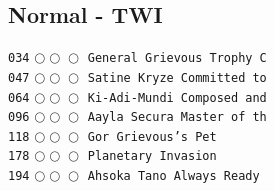 \documentclass[a4paper,landscape]{article}
\begin{document}
\begin{multicols*}{5}
\section{Normal - TWI} 
\vspace{-2mm} 
\texttt{034} \(\bigcirc\!\bigcirc\!\bigcirc\)  \texttt{General Grievous Trophy C} \vspace{-0.3mm}\\ 
\texttt{047} \(\bigcirc\!\bigcirc\!\bigcirc\)  \texttt{Satine Kryze Committed to} \vspace{-0.3mm}\\ 
\texttt{064} \(\bigcirc\!\bigcirc\!\bigcirc\)  \texttt{Ki-Adi-Mundi Composed and} \vspace{-0.3mm}\\ 
\texttt{096} \(\bigcirc\!\bigcirc\!\bigcirc\)  \texttt{Aayla Secura Master of th} \vspace{-0.3mm}\\ 
\texttt{118} \(\bigcirc\!\bigcirc\!\bigcirc\)  \texttt{Gor Grievous's Pet} \vspace{-0.3mm}\\ 
\texttt{178} \(\bigcirc\!\bigcirc\!\bigcirc\)  \texttt{Planetary Invasion} \vspace{-0.3mm}\\ 
\texttt{194} \(\bigcirc\!\bigcirc\!\bigcirc\)  \texttt{Ahsoka Tano Always Ready } \vspace{-0.3mm}\\ 

\end{multicols*}
\end{document}
